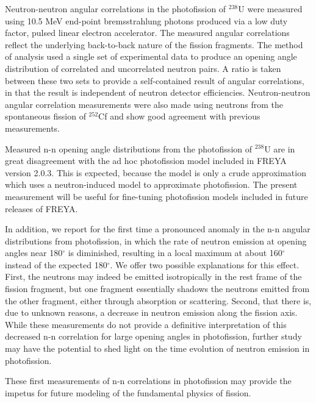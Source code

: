 Neutron-neutron angular correlations in the photofission of $^{238}$U were measured using 10.5 MeV end-point bremsstrahlung photons produced via a low duty factor, pulsed linear electron accelerator.
The measured angular correlations reflect the underlying back-to-back nature of the fission fragments.
The method of analysis used a single set of experimental data to produce an opening angle distribution of correlated and uncorrelated neutron pairs.
A ratio is taken between these two sets to provide a self-contained result of angular correlations, in that the result is independent of neutron detector efficiencies.
Neutron-neutron angular correlation measurements were also made using neutrons from the spontaneous fission of $^{252}$Cf and show good agreement with previous measurements.

Measured n-n opening angle distributions from the photofission of $^{238}$U are in great disagreement with the ad hoc photofission model included in FREYA version 2.0.3.
This is expected, because the model is only a crude approximation which uses a neutron-induced model to approximate photofission.
The present measurement will be useful for fine-tuning photofission models included in future releases of FREYA.

In addition, we report for the first time a pronounced anomaly in the n-n angular distributions from photofission, in which the rate of neutron emission at opening angles near 180$^{\circ}$ is diminished, resulting in a local maximum at about 160$^{\circ}$ instead of the expected 180$^{\circ}$.
We offer two possible explanations for this effect.
First, the neutrons may indeed be emitted isotropically in the rest frame of the fission fragment, but one fragment essentially shadows the neutrons emitted from the other fragment, either through absorption or scattering.
Second, that there is, due to unknown reasons, a decrease in neutron emission along the fission axis.
While these measurements do not provide a definitive interpretation of this decreased n-n correlation for large opening angles in photofission, further study may have the potential to shed light on the time evolution of neutron emission in photofission.

These first measurements of n-n correlations in photofission may provide the impetus for future modeling of the fundamental physics of fission.
